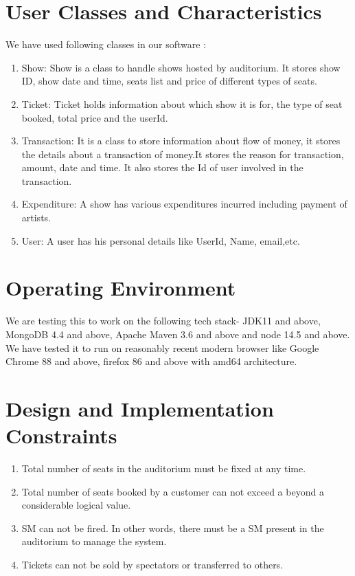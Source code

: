 \documentclass{scrreprt}
\begin{document}
\section{User Classes and Characteristics}
We have used following classes in our software :
\begin{enumerate}
	\item Show: Show is a class to handle shows hosted by auditorium. It stores show ID, show date and time, seats list and price of different types of seats.
	\item Ticket: Ticket holds information about which show it is for, the type of seat booked, total price and the userId.
	\item Transaction: It is a class to store information about flow of money, it stores the details about a transaction of money.It stores the reason for transaction, amount, date and time. It also stores the Id of user involved in the transaction.
	\item Expenditure: A show has various expenditures incurred including payment of artists.
	\item User: A user has his personal details like UserId, Name, email,etc.
\end{enumerate}


\section{Operating Environment}

We are testing this to work on the following tech stack- JDK11 and above, MongoDB 4.4 and above, Apache Maven 3.6 and above and node 14.5 and above. We have tested it to run on reasonably recent modern browser like Google Chrome 88 and above, firefox 86 and above with amd64 architecture.

\section{Design and Implementation Constraints}

\begin{enumerate}
	\item Total number of seats in the auditorium must be fixed at any time.
	
	\item  Total number of seats booked by a customer can not exceed a beyond a considerable logical value.
	
	\item SM can not be fired. In other words, there must be a SM present in the auditorium to manage the system.
	
	\item Tickets can not be sold by spectators or transferred to others.
	
\end{enumerate}
\end{document}
